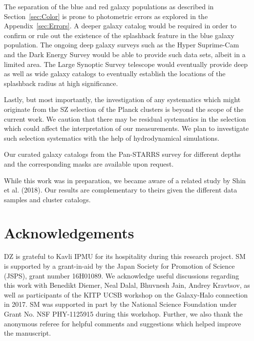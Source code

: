 \documentclass[iop, apjl, twocolappendix, numberedappendix]{emulateapj}
\begin{document}
The separation of the blue and red galaxy populations as described in
Section~\ref{sec:Color} is prone to photometric errors as explored in
the Appendix~\ref{sec:Errors}. A deeper galaxy catalog would be required in order to
confirm or rule out the existence of the splashback feature in the
blue galaxy population. The ongoing deep galaxy surveys such as the
Hyper Suprime-Cam \citep{Aihara2018} and the Dark Energy Survey \citep{Abbott2018} would be able
to provide such data sets, albeit in a limited area. The Large
Synoptic Survey telescope \citep{LSST2009} would eventually provide deep as well
as wide galaxy catalogs to eventually establish the locations of the
splashback radius at high significance.

Lastly, but most importantly, the investigation of any systematics
which might originate from the SZ selection of the Planck clusters
is beyond the scope of the current work. We caution that there may
be residual systematics in the selection which could affect the
interpretation of our measurements. We plan to investigate such
selection systematics with the help of hydrodynamical simulations.

Our curated galaxy catalogs from the Pan-STARRS survey for different
depths and the corresponding masks are available upon request.

While this work was in preparation, we became aware of a related study
by Shin et al. (2018). Our results are complementary to theirs given
the different data samples and cluster catalogs.

\section*{Acknowledgements}
DZ is grateful to Kavli IPMU for its hospitality during this research
project. SM is supported by a grant-in-aid by the Japan Society for
Promotion of Science (JSPS), grant number 16H01089. We acknowledge
useful discussions regarding this work with Benedikt Diemer, Neal
Dalal, Bhuvnesh Jain, Andrey Kravtsov, as well as participants of the
KITP UCSB workshop on the Galaxy-Halo connection in 2017. SM was
supported in part by the National Science Foundation under Grant No.
NSF PHY-1125915 during this workshop. Further, we also thank the anonymous
referee for helpful comments and suggestions which helped improve the
manuscript.
\end{document}
